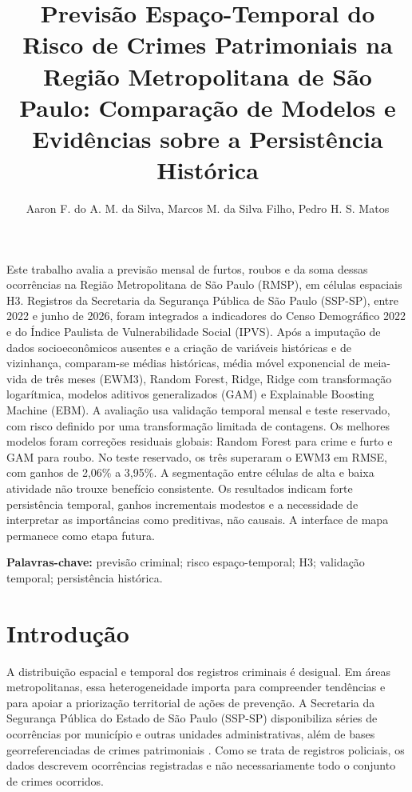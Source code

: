 \documentclass[12pt]{article}
\title{Previsão Espaço-Temporal do Risco de Crimes Patrimoniais na Região Metropolitana de São Paulo: Comparação de Modelos e Evidências sobre a Persistência Histórica}
\author{Aaron F. do A. M. da Silva\inst{1}, Marcos M. da Silva Filho\inst{2}, Pedro H. S. Matos\inst{3}}
\begin{document}
\maketitle

\begin{resumo}
Este trabalho avalia a previsão mensal de furtos, roubos e da soma dessas ocorrências na Região Metropolitana de São Paulo (RMSP), em células espaciais H3. Registros da Secretaria da Segurança Pública de São Paulo (SSP-SP), entre 2022 e junho de 2026, foram integrados a indicadores do Censo Demográfico 2022 e do Índice Paulista de Vulnerabilidade Social (IPVS). Após a imputação de dados socioeconômicos ausentes e a criação de variáveis históricas e de vizinhança, comparam-se médias históricas, média móvel exponencial de meia-vida de três meses (EWM3), Random Forest, Ridge, Ridge com transformação logarítmica, modelos aditivos generalizados (GAM) e Explainable Boosting Machine (EBM). A avaliação usa validação temporal mensal e teste reservado, com risco definido por uma transformação limitada de contagens. Os melhores modelos foram correções residuais globais: Random Forest para crime e furto e GAM para roubo. No teste reservado, os três superaram o EWM3 em RMSE, com ganhos de 2,06\% a 3,95\%. A segmentação entre células de alta e baixa atividade não trouxe benefício consistente. Os resultados indicam forte persistência temporal, ganhos incrementais modestos e a necessidade de interpretar as importâncias como preditivas, não causais. A interface de mapa permanece como etapa futura.
\end{resumo}

\noindent\textbf{Palavras-chave:} previsão criminal; risco espaço-temporal; H3; validação temporal; persistência histórica.

\section{Introdução}

A distribuição espacial e temporal dos registros criminais é desigual. Em áreas metropolitanas, essa heterogeneidade importa para compreender tendências e para apoiar a priorização territorial de ações de prevenção. A Secretaria da Segurança Pública do Estado de São Paulo (SSP-SP) disponibiliza séries de ocorrências por município e outras unidades administrativas, além de bases georreferenciadas de crimes patrimoniais \cite{ssp_dados_mensais,ssp_consultas}. Como se trata de registros policiais, os dados descrevem ocorrências registradas e não necessariamente todo o conjunto de crimes ocorridos.
\end{document}
